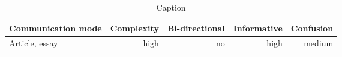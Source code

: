 \begin{table*}\centering
{}
\begin{tabular}{@{}lrrrr@{}}\toprule
Communication mode & Complexity & Bi-directional & Informative  & Confusion
\\\midrule
Article, essay & high & no & high & medium  \\

\bottomrule
\end{tabular}
\caption{Caption}
\end{table*}